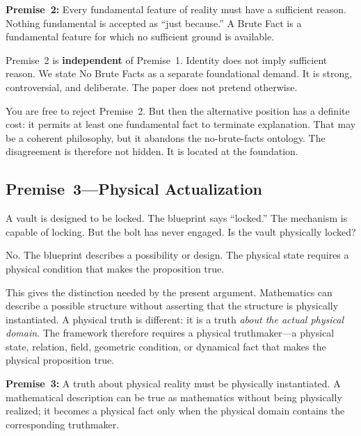 \documentclass[11pt]{article}
\theoremstyle{canonstyle}
\begin{document}
\begin{keyresult}
\textbf{Premise~2:} Every fundamental feature of reality must have a sufficient reason. Nothing fundamental is accepted as ``just because.'' A Brute Fact is a fundamental feature for which no sufficient ground is available.
\end{keyresult}

Premise~2 is \textbf{independent} of Premise~1. Identity does not imply sufficient reason. We state No Brute Facts as a separate foundational demand. It is strong, controversial, and deliberate. The paper does not pretend otherwise.

\begin{ifyoudisagree}
You are free to reject Premise~2. But then the alternative position has a definite cost: it permits at least one fundamental fact to terminate explanation. That may be a coherent philosophy, but it abandons the no-brute-facts ontology. The disagreement is therefore not hidden. It is located at the foundation.
\end{ifyoudisagree}

\subsection{Premise~3---Physical Actualization}

\begin{reflect}
A vault is designed to be locked. The blueprint says ``locked.'' The mechanism is capable of locking. But the bolt has never engaged. Is the vault physically locked?
\end{reflect}

No. The blueprint describes a possibility or design. The physical state requires a physical condition that makes the proposition true.

This gives the distinction needed by the present argument. Mathematics can describe a possible structure without asserting that the structure is physically instantiated. A physical truth is different: it is a truth \emph{about the actual physical domain}. The framework therefore requires a physical truthmaker---a physical state, relation, field, geometric condition, or dynamical fact that makes the physical proposition true.

\begin{keyresult}
\textbf{Premise~3:} A truth about physical reality must be physically instantiated. A mathematical description can be true as mathematics without being physically realized; it becomes a physical fact only when the physical domain contains the corresponding truthmaker.
\end{keyresult}
\end{document}
